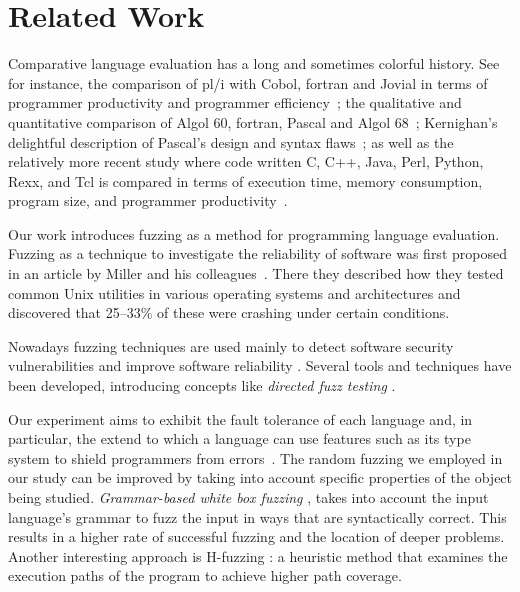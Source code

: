 \documentclass[10pt]{sigplanconf}
\begin{document}
\section{Related Work} %
\label{sec:related}

Comparative language evaluation has a long and sometimes colorful history.
See for instance,
the comparison of {\sc pl/i} with Cobol, {\sc fortran} and Jovial in
terms of programmer productivity and programmer efficiency~\cite{RWSB68};
the qualitative and quantitative comparison of Algol 60,
{\sc fortran}, Pascal and Algol 68~\cite{BOJO80};
Kernighan's delightful description of
Pascal's design and syntax flaws~\cite{Ker81};
as well as the relatively more recent study where code written
C, C++, Java, Perl, Python, Rexx, and Tcl
is compared in terms of execution time, memory consumption,
program size, and programmer productivity~\cite{PREC00}.

Our work introduces fuzzing as a method for programming language
evaluation.
Fuzzing as a technique to investigate the reliability of software
was first proposed in an article by Miller and his colleagues~\cite{MFS90}.
There they described how they tested common Unix
utilities in various operating systems and architectures and discovered that
25--33\% of these were crashing under certain conditions.

Nowadays fuzzing techniques are used mainly to detect software security
vulnerabilities and improve software reliability \cite{TJC08,GODE07}.
Several tools and techniques \cite{WWGZ11} have been developed,
introducing concepts like \textit{directed fuzz testing} \cite{GLRI09}.

Our experiment aims to exhibit the fault tolerance of each language
and, in particular, the extend to which a language can use features such as
its type system to shield programmers from errors~\cite{LYU95,KOKR07}.
The random fuzzing we employed in our study can be improved by taking
into account specific properties of the object being studied.
{\em Grammar-based white box fuzzing} \cite{God08},
takes into account the input language's grammar to fuzz the input in
ways that are syntactically correct.
This results in a higher rate of successful fuzzing and the location
of deeper problems.
Another interesting approach is H-fuzzing \cite{ZWZH11}:
a heuristic method that examines the execution paths of the program
to achieve higher path coverage.
\end{document}
